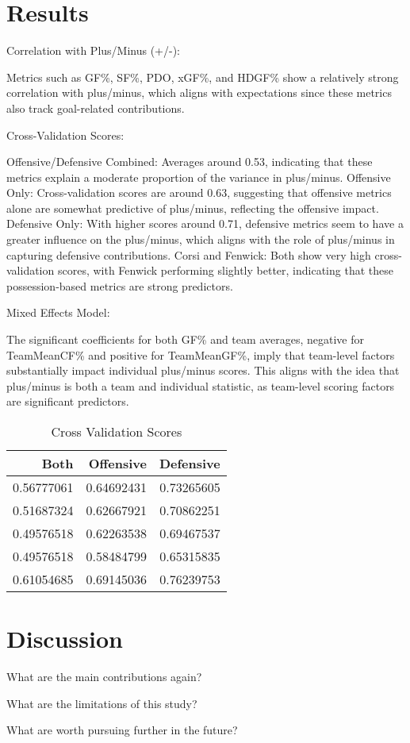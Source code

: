 \documentclass[12pt]{article}
\begin{document}
\section{Results}
\label{sec:resu}

Correlation with Plus/Minus (+/-):

Metrics such as GF\%, SF\%, PDO, xGF\%, and HDGF\% show a relatively strong correlation with plus/minus, which aligns with 
expectations since these metrics also track goal-related contributions. 

Cross-Validation Scores:

Offensive/Defensive Combined: Averages around 0.53, indicating that these metrics explain a moderate proportion of the variance in plus/minus.
Offensive Only: Cross-validation scores are around 0.63, suggesting that offensive metrics alone are somewhat predictive of plus/minus, 
reflecting the offensive impact.
Defensive Only: With higher scores around 0.71, defensive metrics seem to have a greater influence on the plus/minus, which aligns with 
the role of plus/minus in capturing defensive contributions.
Corsi and Fenwick: Both show very high cross-validation scores, with Fenwick performing slightly better, indicating that these 
possession-based metrics are strong predictors.

Mixed Effects Model:

The significant coefficients for both GF\% and team averages, negative for TeamMeanCF\% and positive for TeamMeanGF\%, imply that 
team-level factors substantially impact individual plus/minus scores.
This aligns with the idea that plus/minus is both a team and individual statistic, as team-level scoring factors are significant predictors.

\begin{table}[tbp]
  \caption{Cross Validation Scores}
  \label{tab:rv}
\centering
\begin{tabular}{rrr}
  \toprule
Both & Offensive & Defensive \\ 
  \midrule
  0.56777061 & 0.64692431 & 0.73265605 \\ 
  0.51687324 & 0.62667921 & 0.70862251 \\ 
  0.49576518 & 0.62263538 & 0.69467537 \\ 
  0.49576518 & 0.58484799 & 0.65315835 \\ 
  0.61054685 & 0.69145036 & 0.76239753 \\ 
   \bottomrule
\end{tabular}
\end{table}


\section{Discussion}
\label{sec:disc}

What are the main contributions again?

What are the limitations of this study?

What are worth pursuing further in the future?





\end{document}
